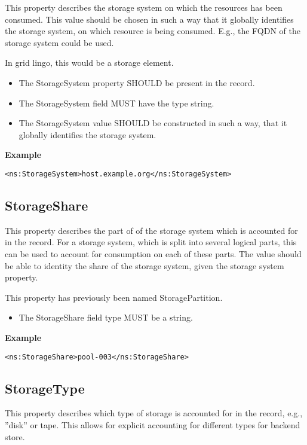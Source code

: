 This property describes the storage system on which the resources has been
consumed. This value should be chosen in such a way that it globally
identifies the storage system, on which resource is being consumed. E.g., the
FQDN of the storage system could be used.

In grid lingo, this would be a storage element.

\begin{itemize}
\item The StorageSystem property SHOULD be present in the record.
\item The StorageSystem field MUST have the type string.
\item The StorageSystem value SHOULD be constructed in such a way, that it
    globally identifies the storage system.
\end{itemize}

{\bf Example}
\begin{verbatim}
<ns:StorageSystem>host.example.org</ns:StorageSystem>
\end{verbatim}


\subsection{StorageShare}

This property describes the part of of the storage system which is accounted
for in the record. For a storage system, which is split into several logical
parts, this can be used to account for consumption on each of these parts.
The value should be able to identity the share of the storage system, given
the storage system property.

This property has previously been named StoragePartition.

\begin{itemize}
\item The StorageShare field type MUST be a string.
\end{itemize}

{\bf Example}
\begin{verbatim}
<ns:StorageShare>pool-003</ns:StorageShare>
\end{verbatim}


\subsection{StorageType}

This property describes which type of storage is accounted for in the record,
e.g., ''disk'' or tape. This allows for explicit accounting for different types for
backend store.

